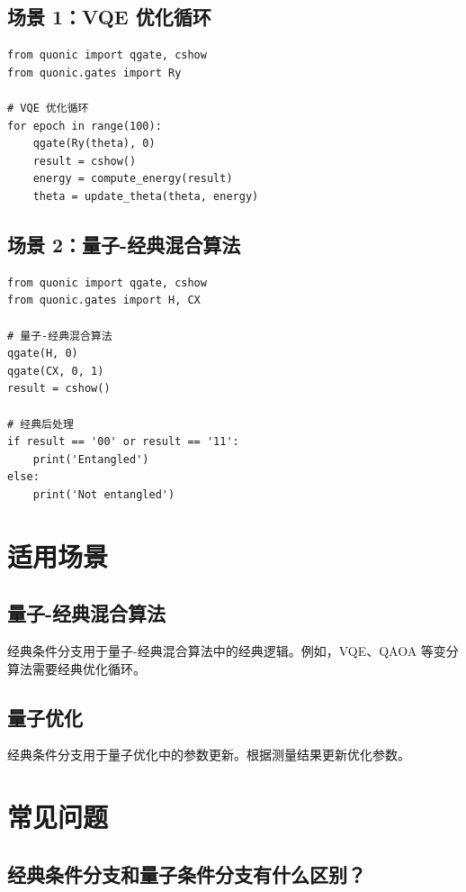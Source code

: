 \documentclass[12pt,a4paper]{article}
\begin{document}
\subsection{场景 1：VQE 优化循环}

\begin{verbatim}
from quonic import qgate, cshow
from quonic.gates import Ry

# VQE 优化循环
for epoch in range(100):
    qgate(Ry(theta), 0)
    result = cshow()
    energy = compute_energy(result)
    theta = update_theta(theta, energy)
\end{verbatim}

\subsection{场景 2：量子-经典混合算法}

\begin{verbatim}
from quonic import qgate, cshow
from quonic.gates import H, CX

# 量子-经典混合算法
qgate(H, 0)
qgate(CX, 0, 1)
result = cshow()

# 经典后处理
if result == '00' or result == '11':
    print('Entangled')
else:
    print('Not entangled')
\end{verbatim}

\section{适用场景}

\subsection{量子-经典混合算法}

经典条件分支用于量子-经典混合算法中的经典逻辑。例如，VQE、QAOA 等变分算法需要经典优化循环。

\subsection{量子优化}

经典条件分支用于量子优化中的参数更新。根据测量结果更新优化参数。

\section{常见问题}

\subsection{经典条件分支和量子条件分支有什么区别？}
\end{document}
